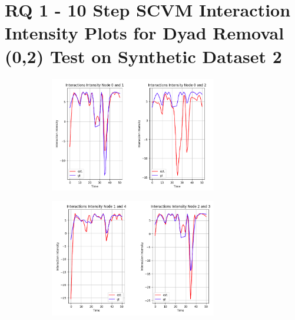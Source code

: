 \section{RQ 1 - 10 Step SCVM Interaction Intensity Plots for Dyad Removal (0,2) Test on Synthetic Dataset 2}
\label{appendix:rq1:part2:10step_dyad_remove}
\begin{figure}[H]
    \centering
    \begin{subfigure}[b]{\textwidth}
        \centering
        \includegraphics[width=0.8\textwidth]{0_images/10step_SCVM_dyad_removal_plot1.png}
    \end{subfigure}
    \vfill
    \begin{subfigure}[b]{\textwidth}
        \centering
        \includegraphics[width=0.8\textwidth]{0_images/10step_SCVM_dyad_removal_plot2.png}
    \end{subfigure}
\end{figure}
